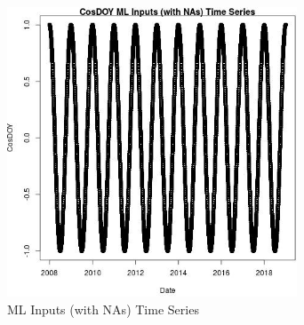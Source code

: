\begin{figure} 
\centering  
\includegraphics[width=0.77\textwidth]{Code_Outputs/Report_ML_input_PM25_Step4_part_f_de_duplicated_aveswNAs_CosDOYvDate.jpg} 
\caption{\label{fig:Report_ML_input_PM25_Step4_part_f_de_duplicated_aveswNAsCosDOYvDate}ML Inputs (with NAs) Time Series} 
\end{figure} 
 
